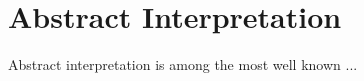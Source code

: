\section{Abstract Interpretation}
\label{sec:abstrint}

Abstract interpretation is among the most well known ...

